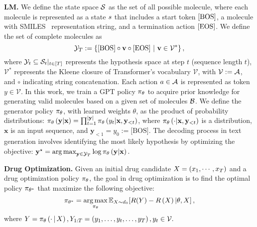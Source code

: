 \textbf{LM.} We define the state space $\mathcal{S}$ as the set of all possible molecule, where each molecule is represented as a state $s$ that includes a start token $\left[\text{BOS}\right]$, a molecule with SMILES~\citep{weininger1988smiles} representation string, and a termination action $\left[\text{EOS}\right]$. 
We define the set of complete molecules as
\begin{equation}
    \mathcal{Y}_{T} := \left\{\text{[BOS]} \circ \mathbf{v} \circ \text{[EOS]}~|~\mathbf{v}\in \mathcal{V}^*\right\},
\end{equation}
where $\mathcal{Y}_t \subseteq \mathcal{S}_t|_{t\in \left[T\right]}$ represents the hypothesis space at step $t$ (sequence length $t$), $\mathcal{V}^*$ represents the Kleene closure of Transformer's vocabulary $\mathcal{V}$, with  $\mathcal{V}:=\mathcal{A}$, and $\circ$ indicating string concatenation. 
Each action $a \in \mathcal{A}$ is represented as token $y \in \mathcal{V}$.
In this work, we train a GPT policy $\pi_{\theta}$ to acquire prior knowledge for generating valid molecules based on a given set of molecules $\mathcal{B}$.
We define the generator policy $\pi_{\theta}$, with learned weights $\theta$, as the product of probability distributions: $\pi_{\theta} \left( {\mathbf{y}|\mathbf{x}} \right) =\prod_{t=1}^{|\mathbf{y}|} \pi_{\theta} \left( {y_t|\mathbf{x},\mathbf{y}_{<t}} \right) $, 
where  $\pi_{\theta} \left( {\cdot|\mathbf{x},\mathbf{y}_{<t}} \right) $ is a distribution,  $\mathbf{x}$ is an input sequence, and $\mathbf{y}_{<1}=y_0:=\text{[BOS]}$.
The decoding process in text generation involves identifying the most likely hypothesis by optimizing the objective:
$\mathbf{y}^{\star}=\mathop{\rm arg\,max}_{\mathbf{y}\in \mathcal{Y}_{T}} \log \pi_{\theta} \left( {\mathbf{y}|\mathbf{x}} \right) .$













\textbf{Drug Optimization.} Given an initial drug candidate $X= \left( {x_1,\cdots,x_{T}} \right) $ and a drug optimization policy $\pi_{\theta}$, the goal in drug optimization is to find the optimal policy $\pi_{\theta^*}$ that
maximize the following objective:
\begin{equation}\label{eq:drug_generation_objective}
\pi_{\theta^*}=
\mathop{\rm arg\,max}_{\pi_{\theta}}
\mathbb{E}_{X \sim {d_0}}\!\left[R(Y)-R \left( {X} \right) |\theta,X\right], 
\end{equation}
where 
 $Y=\pi_{\theta} \left( {\cdot{\,|\,} X} \right) , Y_{1:T}= \left( {y_1,\ldots,y_t,\ldots,y_{T}} \right) ,y_t\in \mathcal{V}.$










